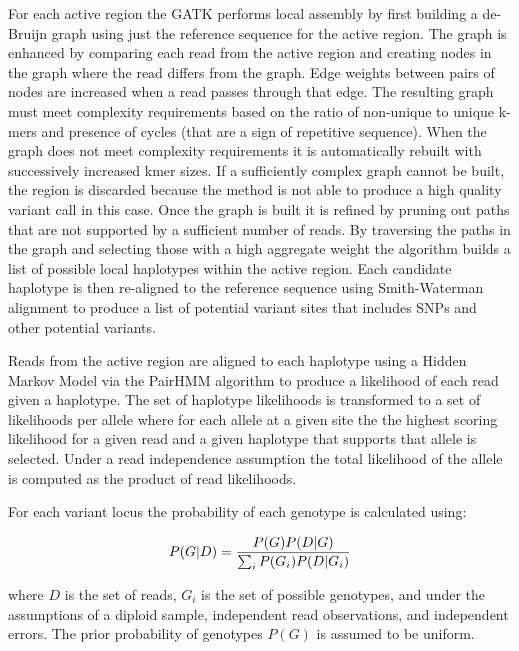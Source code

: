 For each active region the GATK performs local assembly by first building a de-Bruijn graph\autocite{compeau2011apply} using just the reference sequence for the active region. The graph is enhanced by comparing each read from the active region and creating nodes in the graph where the read differs from the graph. Edge weights between pairs of nodes are increased when a read passes through that edge. The resulting graph must meet complexity requirements based on the ratio of non-unique to unique k-mers and presence of cycles (that are a sign of repetitive sequence). When the graph does not meet complexity requirements it is automatically rebuilt with successively increased kmer sizes. If a sufficiently complex graph cannot be built, the region is discarded because the method is not able to produce a high quality variant call in this case. Once the graph is built it is refined by pruning out paths that are not supported by a sufficient number of reads. By traversing the paths in the graph and selecting those with a high aggregate weight the algorithm builds a list of possible local haplotypes within the active region. Each candidate haplotype is then re-aligned to the reference sequence using Smith-Waterman\autocite{smith1981comparison} alignment to produce a list of potential variant sites that includes SNPs and other potential variants.

Reads from the active region are aligned to each haplotype using a Hidden Markov Model via the PairHMM algorithm\autocite{durbin1998biological} to produce a likelihood of each read given a haplotype. The set of haplotype likelihoods is transformed to a set of likelihoods per allele where for each allele at a given site the the highest scoring likelihood for a given read and a given haplotype that supports that allele is selected. Under a read independence assumption the total likelihood of the allele is computed as the product of read likelihoods.

For each variant locus the probability of each genotype is calculated using:

\begin{equation}
    \label{eq:gatk_genotyping}
P(G|D) = {P(G)P(D|G)\over\sum_i P(G_i)P(D|G_i)}
\end{equation}

where $D$ is the set of reads, $G_i$ is the set of possible genotypes, and under the assumptions of a diploid sample, independent read observations, and independent errors. The prior probability of genotypes $P(G)$ is assumed to be uniform. 

